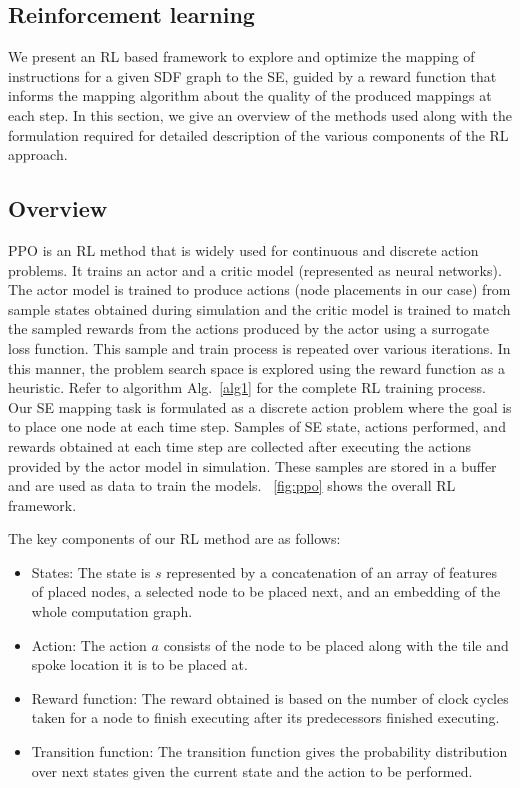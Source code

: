 \subsection{Reinforcement learning}

We present an RL based framework to explore and optimize the mapping of instructions for a given SDF graph to the SE, guided by a reward function that informs the mapping algorithm about the quality of the produced mappings at each step. In this section, we give an overview of the methods used along with the formulation required for detailed description of the various components of the RL approach.

\subsection{Overview}
PPO \cite{schulman2017proximal} is an RL method that is  widely used for continuous and discrete action problems. 
It trains an actor and a critic model (represented as neural networks).
The actor model is trained to produce actions (node placements in our case) from sample states obtained during simulation and the critic model is trained to match the sampled rewards from the actions produced by the actor using a surrogate loss function. 
This sample and train process is repeated over various iterations. 
In this manner, the problem search space is explored using the reward function as a heuristic.
Refer to algorithm Alg.~\ref{alg1} for the complete RL training process.
Our SE mapping task is formulated as a discrete action problem where the goal is to place one node at each time step. 
Samples of SE state, actions performed, and rewards obtained at each time step are collected after executing the actions provided by the actor model in simulation. 
These samples are stored in a buffer and are used as data to train the models.
\figurename~\ref{fig:ppo} shows the overall RL framework. 

The key components of our RL method are as follows:
\begin{itemize}
  \item States: The state is $s$ represented by a concatenation of an array of features of placed nodes, a selected node to be placed next, and an embedding of the whole computation graph. 
  \item Action: The action $a$ consists of the node to be placed along with the tile and spoke location it is to be placed at.
  \item Reward function: The reward obtained is based on the number of clock cycles taken for a node to finish executing after its predecessors finished executing.
  \item Transition function: The transition function gives the probability distribution over next states given the current state and the action to be performed.
\end{itemize}

